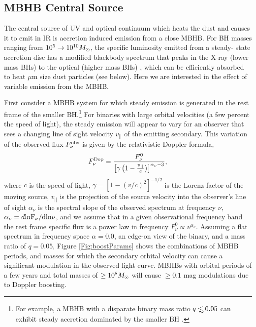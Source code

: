 \subsection{MBHB Central Source} 

The central source of UV and optical continuum which heats the dust and causes
it to emit in IR is accretion induced emission from a close MBHB. For BH
masses ranging from $10^5 \rightarrow 10^{10} {M_{\odot}}$, the specific luminosity
emitted from a steady- state accretion disc has a modified blackbody spectrum
that peaks in the X-ray (lower mass BHs) to the optical (higher mass BHs)
\citep{SS73, TanakaMenou:2010}, which can be efficiently absorbed to heat
$\mu$m size dust particles (see below). Here we are interested in the effect
of variable emission from the MBHB.

First consider a MBHB system for which steady emission is generated in the
rest frame of the smaller BH.\footnote{For example, a MBHB with a disparate binary mass
ratio $q \lsim0.05$ can exhibit steady accretion dominated by the smaller BH
\citep{Farris:2014}.} For binaries with large orbital velocities (a few
percent the speed of light), the steady emission will appear to vary for an
observer that sees a changing line of sight velocity $v_{||}$ of the emitting
secondary. This variation of the observed flux $F^{\rm{obs}}_{\nu}$ is given
by the relativistic Doppler formula,
\begin{equation}
F^{\rm{Dop}}_{\nu} = \frac{F^0_{\nu}}{\left[\gamma\left( 1 - \frac{v_{||}}{c}\right)\right]^{\alpha_{\nu} - 3}},
\label{Eq:Dop1}
\end{equation}
where $c$ is the speed of light, $\gamma = \left[ 1 - (v/c)^2 \right]^{-1/2}$
is the Lorenz factor of the moving source, $v_{||}$ is the projection of the
source velocity into the observer's line of sight $\alpha_{\nu}$ is the
spectral slope of the observed spectrum at frequency $\nu$, $\alpha_{\nu} =
d\rm{ln}F_{\nu} / d \rm{ln}\nu$, and we assume that in a given observational
frequency band the rest frame specific flux is a power law in frequency
$F^0_{\nu} \propto \nu^{\alpha_{\nu}}$. Assuming a flat spectrum in frequency
space $\alpha=0.0$, an edge-on view of the binary, and a mass ratio of
$q=0.05$, Figure \ref{Fig:boostParams} shows the combinations of MBHB periods,
and masses for which the secondary orbital velocity can cause a significant
modulation in the observed light curve. MBHBs with orbital periods of a
few years and total masses of $\geq 10^8 {M_{\odot}}$ will cause $\geq 0.1$ mag
modulations due to Doppler boosting.

